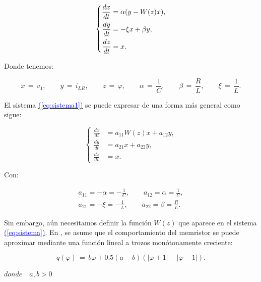 \documentclass[12pt,a4paper]{report} %
\newcommand{\eref}[1]{\hyperref[#1]{\textcolor{blue}{(\ref*{#1})}}}
\begin{document}
	\begin{equation}
		\label{eq:sistema1}
		\scalebox{1}{$\displaystyle
			\left\{
			\begin{aligned}
				\frac{dx}{dt} &= \alpha (y - W(z)x), \\
				\frac{dy}{dt} &= -\xi x + \beta y, \\
				\frac{dz}{dt} &= x.
			\end{aligned}
			\right.
			$}
	\end{equation}\smallskip
	
	\noindent Donde tenemos:
	
	\begin{equation*}
		x\,=\,v_1, \qquad y\,=\,i_{LR}, \qquad z\,=\,\varphi, \qquad \alpha\,=\,\frac{1}{C}, \qquad \beta\,=\,\frac{R}{L}, \qquad \xi\,=\,\frac{1}{L}.
	\end{equation*}\smallskip
	
	\noindent El sistema \eref{eq:sistema1} se puede expresar de una forma más general como sigue:
	
	\begin{equation}
		\label{eq:sistema}
			\left\{
			\begin{aligned}
				\frac{dx}{dt} &= a_{11}W(z)x+a_{12}y, \\
				\frac{dy}{dt} &=  a_{21}x+ a_{22}y, \\
				\frac{dz}{dt} &= x.
			\end{aligned}
			\right.
	\end{equation}\smallskip
	
	\noindent Con:
	
	\begin{equation}
		\label{eq:amatriz}
	\begin{gathered}
		a_{11}=-\alpha=-\frac{1}{C}, \qquad a_{12}=\alpha=\frac{1}{C},\\[2mm]
		a_{21}=-\xi =-\frac{1}{L}, \qquad a_{22}=\beta = \frac{R}{L}.
	\end{gathered}
	\end{equation}\smallskip
	
	\newpage
	
	Sin embargo, aún necesitamos definir la función $W(z)$ que aparece en el sistema \eref{eq:sistema}. En \cite{chuaoscillator2008}, se asume que el comportamiento del memristor se puede aproximar mediante una función lineal a trozos monótonamente creciente:
	
	\begin{equation}
		q(\varphi)\,=\,b\varphi+0.5(a-b)(|\varphi+1|-|\varphi-1|).
		\label{eq:qf}
	\end{equation}
    \begin{center}
    	$ donde \quad a,b> 0$
    \end{center}\smallskip
    
\end{document}
